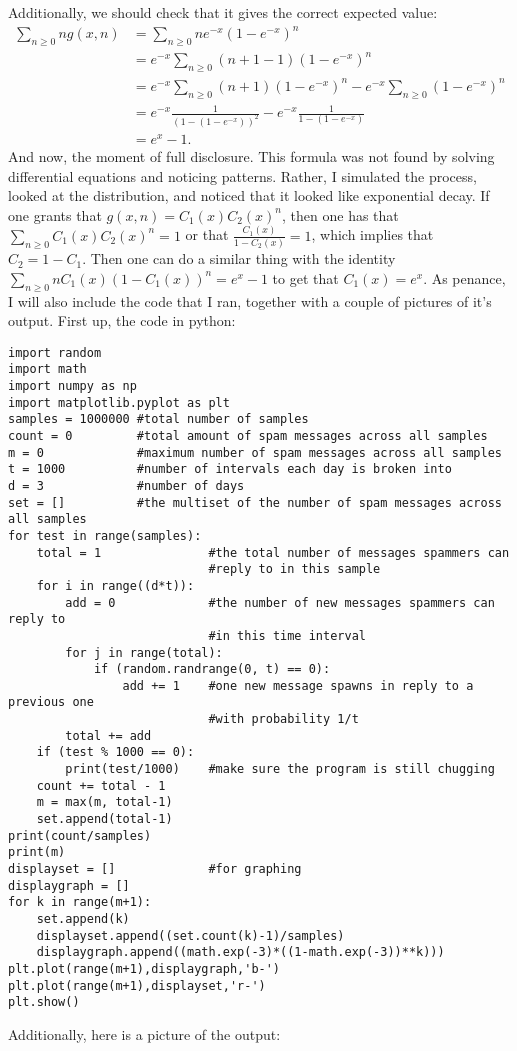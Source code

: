 \documentclass[11pt]{article}
\theoremstyle{definition}
\begin{document}
Additionally, we should check that it gives the correct expected value:
\begin{align*}
\sum_{n \geq 0}ng(x, n) & = \sum_{n\geq 0} ne^{-x}(1-e^{-x})^n \\
& = e^{-x}\sum_{n\geq0}(n+1-1)(1-e^{-x})^n \\
& = e^{-x}\sum_{n\geq 0}(n+1)(1-e^{-x})^n - e^{-x}\sum_{n\geq0}(1-e^{-x})^n \\
& = e^{-x}\frac{1}{(1-(1-e^{-x}))^2} - e^{-x}\frac{1}{1-(1-e^{-x})} \\
& = e^x - 1.
\end{align*}
And now, the moment of full disclosure.  This formula was not found by solving differential equations and noticing patterns.  Rather, I simulated the process, looked at the distribution, and noticed that it looked like exponential decay.  If one grants that $g(x, n) = C_1(x)C_2(x)^n$, then one has that $\displaystyle{\sum_{n\geq 0} C_1(x)C_2(x)^n} = 1$ or that $\frac{C_1(x)}{1-C_2(x)} = 1$, which implies that $C_2 = 1-C_1$.  Then one can do a similar thing with the identity $\displaystyle{\sum_{n\geq0} n C_1(x)(1-C_1(x))^n} = e^x - 1$ to get that $C_1(x) = e^x$.  As penance, I will also include the code that I ran, together with a couple of pictures of it's output.  First up, the code in python:
\pagebreak
\begin{verbatim}
import random
import math
import numpy as np
import matplotlib.pyplot as plt
samples = 1000000 #total number of samples
count = 0         #total amount of spam messages across all samples
m = 0             #maximum number of spam messages across all samples
t = 1000          #number of intervals each day is broken into
d = 3             #number of days
set = []          #the multiset of the number of spam messages across all samples
for test in range(samples):
    total = 1               #the total number of messages spammers can 
                            #reply to in this sample
    for i in range((d*t)):  
        add = 0             #the number of new messages spammers can reply to 
                            #in this time interval
        for j in range(total):
            if (random.randrange(0, t) == 0):
                add += 1    #one new message spawns in reply to a previous one 
                            #with probability 1/t
        total += add
    if (test % 1000 == 0):
        print(test/1000)    #make sure the program is still chugging
    count += total - 1      
    m = max(m, total-1)
    set.append(total-1)
print(count/samples)
print(m)
displayset = []             #for graphing
displaygraph = []
for k in range(m+1):
    set.append(k)
    displayset.append((set.count(k)-1)/samples)
    displaygraph.append((math.exp(-3)*((1-math.exp(-3))**k)))
plt.plot(range(m+1),displaygraph,'b-')
plt.plot(range(m+1),displayset,'r-')
plt.show()
\end{verbatim}
Additionally, here is a picture of the output:
\end{document}
